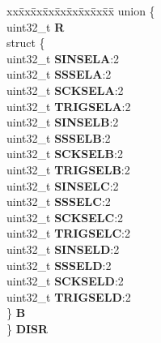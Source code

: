 \begin{DoxyCompactItemize}
\begin{tabbing}
\end{tabbing}\item 
\mbox{\label{structSIU__tag_a0f76e2b8eb41d22526909b79827264b0}} 
\begin{tabbing}
xx\=xx\=xx\=xx\=xx\=xx\=xx\=xx\=xx\=\kill
union \{\\
\>uint32\_t {\bfseries R}\\
\>struct \{\\
\>\>uint32\_t {\bfseries SINSELA}:2\\
\>\>uint32\_t {\bfseries SSSELA}:2\\
\>\>uint32\_t {\bfseries SCKSELA}:2\\
\>\>uint32\_t {\bfseries TRIGSELA}:2\\
\>\>uint32\_t {\bfseries SINSELB}:2\\
\>\>uint32\_t {\bfseries SSSELB}:2\\
\>\>uint32\_t {\bfseries SCKSELB}:2\\
\>\>uint32\_t {\bfseries TRIGSELB}:2\\
\>\>uint32\_t {\bfseries SINSELC}:2\\
\>\>uint32\_t {\bfseries SSSELC}:2\\
\>\>uint32\_t {\bfseries SCKSELC}:2\\
\>\>uint32\_t {\bfseries TRIGSELC}:2\\
\>\>uint32\_t {\bfseries SINSELD}:2\\
\>\>uint32\_t {\bfseries SSSELD}:2\\
\>\>uint32\_t {\bfseries SCKSELD}:2\\
\>\>uint32\_t {\bfseries TRIGSELD}:2\\
\>\} {\bfseries B}\\
\} {\bfseries DISR}\\


\end{tabbing}
\end{DoxyCompactItemize}
